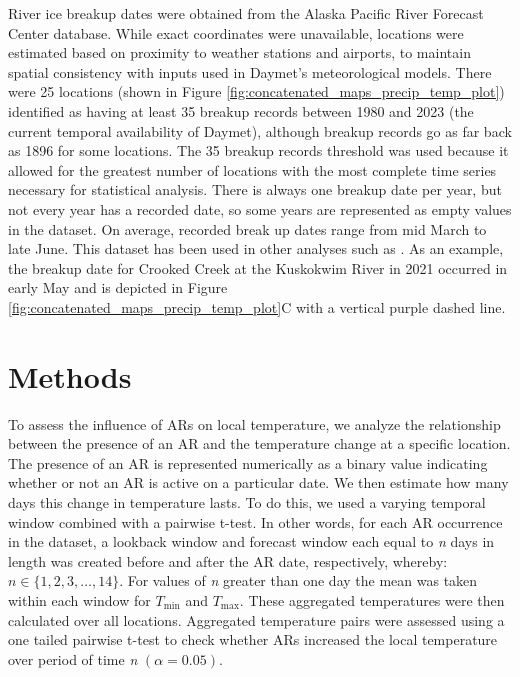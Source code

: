 \documentclass[12pts,draft]{AR_analysis_}
\begin{document}
River ice breakup dates 
were obtained from the Alaska Pacific River Forecast Center database.
While exact coordinates were unavailable, locations 
were estimated based on proximity to weather stations and airports, to 
maintain spatial consistency with inputs used in Daymet’s meteorological 
models. There were 25 locations (shown in Figure 
\ref{fig:concatenated_maps_precip_temp_plot}) identified as 
having at least 35 breakup 
records between 1980 and 2023 (the current temporal availability of 
Daymet), although breakup records go as far back as 1896 for some 
locations. The 35 breakup records threshold was used because it 
allowed for the greatest 
number of locations with the most complete time series 
necessary for statistical analysis. There is always one breakup 
date per year, but not every year has a recorded date, so some 
years are represented as empty values in the dataset. On average, 
recorded break up dates range from mid March to late 
June. This dataset has been used in other analyses such as 
\cite{murphy2022, Brown2018, Bieniek2011}. As an example, 
the breakup date for Crooked Creek 
at the Kuskokwim River in 2021 occurred in early May and
is depicted in Figure 
\ref{fig:concatenated_maps_precip_temp_plot}C with a 
vertical purple dashed line.



\section{Methods}

To assess the influence of ARs on local temperature, we analyze 
the relationship between the presence of an AR and the temperature 
change at a specific location. The presence of an AR is represented 
numerically as a binary value indicating whether or not an AR is 
active on a particular date. We then estimate how many days this 
change in temperature lasts. To do this, we used a
varying temporal window combined with a pairwise t-test. In other 
words, for each
AR occurrence in the dataset, a lookback window and forecast 
window each equal to \emph{n}
days in length was created before and after the AR date, respectively,
whereby: $ n \in \{1, 2, 3, \ldots, 14\}$.
For values of \emph{n} greater than one day the mean was 
taken within each window
for $T_{\text{min}}$ and $T_{\text{max}}$. These aggregated 
temperatures were then
calculated over all locations. Aggregated temperature pairs 
were assessed using a one tailed pairwise t-test to check
whether ARs increased the local temperature over period of 
time \emph{n} $(\alpha =
0.05)$. 
\end{document}
